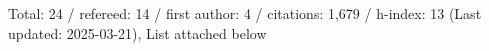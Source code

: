 Total: 24 / refereed: 14 / first author: 4 / citations: 1,679 / h-index: 13 (Last updated: 2025-03-21), List attached below